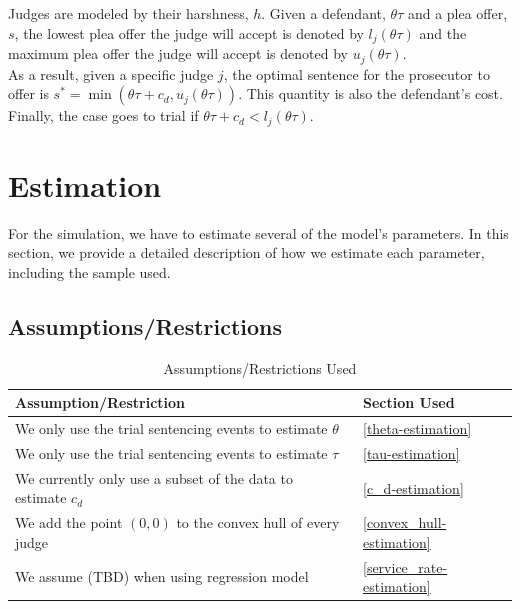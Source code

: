 \documentclass[11pt]{article}
\theoremstyle{ModifiedStyle}
\begin{document}
  Judges are modeled by their harshness, $h$. Given a defendant, $\theta \tau$ and a plea offer, $s$, the lowest plea offer the judge will accept is denoted by $l_j(\theta \tau)$ and the maximum plea offer the judge will accept is denoted by $u_j(\theta \tau)$.\\

  As a result, given a specific judge $j$, the optimal sentence for the prosecutor to offer is $s^* = \min(\theta \tau + c_d,u_j(\theta \tau))$. This quantity is also the defendant's cost. Finally, the case goes to trial if $\theta \tau + c_d < l_j(\theta \tau)$.

\section{Estimation}
  For the simulation, we have to estimate several of the model's parameters. In this section, we provide a detailed description of how we estimate each parameter, including the sample used.

  \subsection{Assumptions/Restrictions}
    \begin{table}[H]
      \centering
      \caption{Assumptions/Restrictions Used}
      \label{tab:assumptions}
      \begin{tabular}{ll}
      \hline
      \textbf{Assumption/Restriction}                              & \textbf{Section Used}        \\ \hline
      We only use the trial sentencing events to estimate $\theta$ & \ref{theta-estimation}       \\
      We only use the trial sentencing events to estimate $\tau$   & \ref{tau-estimation}         \\
      We currently only use a subset of the data to estimate $c_d$ & \ref{c_d-estimation}         \\
      We add the point $(0,0)$ to the convex hull of every judge   & \ref{convex_hull-estimation} \\
      We assume (TBD) when using regression model & \ref{service_rate-estimation}} \\ \hline
      \end{tabular}
    \end{table}
\end{document}
